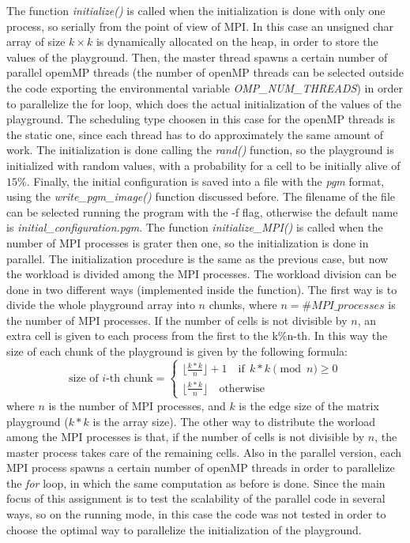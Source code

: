 \documentclass[12pt, titlepage]{report}
\begin{document}
The function \emph{initialize()} is called when the initialization is done with only one process, so serially from the point of view of MPI. 
In this case an unsigned char array of size $k\times k$ is dynamically allocated on the heap, in order to store the values of the playground. Then, 
the master thread spawns a certain number of parallel opemMP threads (the number of openMP threads can be selected outside the code exporting the environmental
variable \emph{OMP\_NUM\_THREADS}) in order to parallelize the for loop, which does the actual initialization of the values of the playground. The scheduling type
choosen in this case for the openMP threads is the static one, since each thread has to do approximately the same amount of work. The initialization is done 
calling the \emph{rand()} function, so the playground is initialized with random values, with a probability for a cell to be initially alive of $15\%$. Finally, 
the initial configuration is saved into a file with the \emph{pgm} format, using the \emph{write\_pgm\_image()} function discussed before. The filename of the
file can be selected running the program with the -f flag, otherwise the default name is \emph{initial\_configuration.pgm}. 
The function \emph{initialize\_MPI()} is called when the number of MPI processes is grater then one, so the initialization is done in parallel. The initialization procedure
is the same as the previous case, but now the workload is divided among the MPI processes. The workload division can be done in two different ways (implemented 
inside the function). The first way is to divide the whole playground array into $n$ chunks, where $n=\#MPI\_processes$ is the number of MPI processes. 
If the number of cells is not divisible by $n$, an extra cell is given to each process from the first to the k\%n-th. In this way the size of each chunk 
of the playground is given by the following formula:
\begin{equation}
	\text{size of $i$-th chunk}	= 
		\begin{cases}
			\lfloor{\frac{k*k}{n}}\rfloor + 1 \quad \text{if} \ \ k*k \pmod{n} \geq 0 \\
			\lfloor{\frac{k*k}{n}}\rfloor \quad \text{otherwise}
		\end{cases}
\end{equation}
where $n$ is the number of MPI processes, and $k$ is the edge size of the matrix playground ($k*k$ is the array size). 
The other way to distribute the worload among the MPI processes is that, if the number of cells is not divisible by $n$, the master
process takes care of the remaining cells. Also in the parallel version, each MPI process spawns a certain number of openMP threads
in order to parallelize the \emph{for} loop, in which the same computation as before is done. 
Since the main focus of this assignment is to test the scalability of the parallel code in several ways, so on the running mode, in this case 
the code was not tested in order to choose the optimal way to parallelize the initialization of the playground. 
\end{document}
